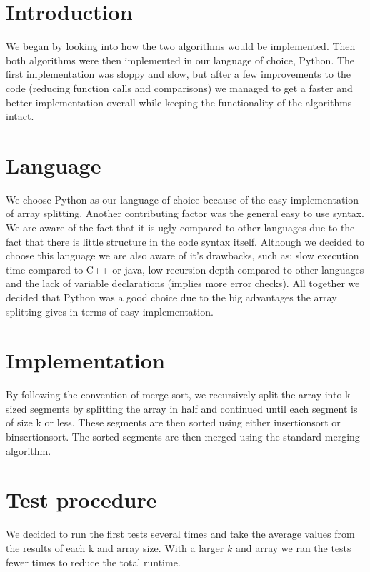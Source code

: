 \documentclass[paper=a4, fontsize=11pt]{scrartcl}
\numberwithin{equation}{section}		%
\numberwithin{figure}{section}			%
\numberwithin{table}{section}				%
\begin{document}
\tableofcontents
\newpage

\section{Introduction}   %
We began by looking into how the two algorithms would be implemented. Then both algorithms were then implemented in our language of choice, Python. The first implementation was sloppy and slow, but after a few improvements to the code (reducing function calls and comparisons) we managed to get a faster and better implementation overall while keeping the functionality of the algorithms intact. 

\section{Language}
We choose Python as our language of choice because of the easy implementation of array splitting. Another contributing factor was the general easy to use syntax. We are aware of the fact that it is ugly compared to other languages due to the fact that there is little structure in the code syntax itself. Although we decided to choose this language we are also aware of it's drawbacks, such as: slow execution time compared to C++ or java, low recursion depth compared to other languages and the lack of variable declarations (implies more error checks). All together we decided that Python was a good choice due to the big advantages the array splitting gives in terms of easy implementation.

\section{Implementation}
By following the convention of merge sort, we recursively split the array into k-sized segments by splitting the array in half and continued until each segment is of size k or less. These segments are then sorted using either insertionsort or binsertionsort. The sorted segments are then merged using the standard merging algorithm.

\section{Test procedure}
We decided to run the first tests several times and take the average values from the results of each k and array size. With a larger $k$ and array we ran the tests fewer times to reduce the total runtime.  
\end{document}

